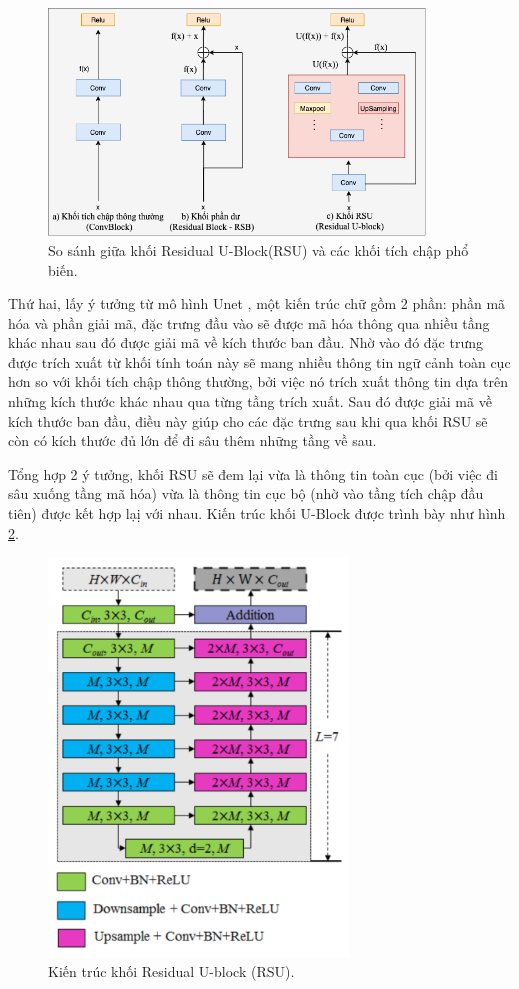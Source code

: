 \begin{figure}[H]
	\begin{center}
		\includegraphics[width=10cm]{images/blood/compareRSU.png}
		\caption{So sánh giữa khối Residual U-Block(RSU) và  các khối tích chập phổ biến. }
		\label{RSB}
	\end{center}
\end{figure}
\vspace{-1.0cm}
Thứ hai, lấy ý tưởng từ mô hình Unet \cite{Unet}, một kiến trúc chữ gồm 2 phần: phần mã hóa và phần giải mã, đặc trưng đầu vào sẽ được mã hóa thông qua nhiều tầng khác nhau sau đó được giải mã về kích thước ban đầu. Nhờ vào đó đặc trưng được trích xuất từ khối tính toán này sẽ mang nhiều thông tin ngữ cảnh toàn cục hơn so với khối tích chập thông thường, bởi việc nó trích xuất thông tin dựa trên những kích thước khác nhau qua từng tầng trích xuất. Sau đó được giải mã về kích thước ban đầu, điều này giúp cho các đặc trưng sau khi qua khối RSU sẽ còn có kích thước đủ lớn để đi sâu thêm những tầng về sau.

Tổng hợp 2 ý tưởng, khối RSU sẽ đem lại vừa là thông tin toàn cục (bởi việc đi sâu xuống tầng mã hóa) vừa là thông tin cục bộ (nhờ vào tầng tích chập đầu tiên) được kết hợp lạị với nhau. Kiến trúc khối U-Block được trình bày như hình \ref{rsu}.

\begin{figure}[H]
	\begin{center}
		\includegraphics[width=8cm]{images/blood/RSU.png}
		\caption{Kiến trúc khối Residual U-block (RSU)\cite{u2-net}. }
		\label{rsu}
	\end{center}
\end{figure}
\vspace{-1.0cm}

